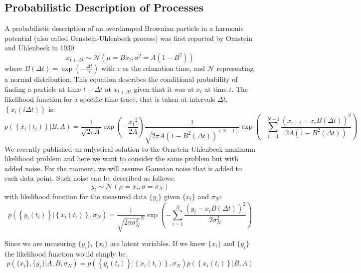 \documentclass[%
 reprint,
 amsmath,amssymb,
 aps,
]{revtex4-1}
\begin{document}
\subsection{Probabilistic Description of Processes}
A probabilistic description of an overdamped Brownian particle in a harmonic potential (also called Ornstein-Uhlenbeck process) was first reported by Ornstein and Uhlenbeck in 1930 \cite{RN28}
\begin{equation}\label{OUp}
	x_{t+\Delta t} \sim \mathcal{N}(\mu=Bx_{t},\sigma^{2}=A(1-B^{2}))
\end{equation}
where $B(\Delta t) = \exp \left( { - \frac{\Delta t}{\tau}} \right)$ with $\tau$ as the relaxation time, and $\mathcal{N}$ representing a normal distribution.
This equation describes the conditional probability of finding a particle at time $t+\Delta t$ at $x_{t+\Delta t}$ given that it was at $x_{t}$ at time $t$.  The likelihood function for a specific time trace, that is taken at intervals $\Delta t$, $\left\{x_i(i\Delta t)\right\}$ is:
\begin{equation}
	p\left( \left\{x_i(t_i)\right\} \left| B, A \right.\right) =
	\frac{1}{\sqrt {2 \pi A} }
	\exp \left( { - \frac{{x_1}^2}{2A}}\right)
	\frac{1}{{\sqrt {2\pi A(1-B^{2}(\Delta t))}^{(N-1)} }}
	\exp \left( { - \sum\limits_{i=1}^{N-1}\frac{{{{\left( {x_{i+1} - {x_i}B(\Delta t)} \right)}^2}}}{{2A(1-B^{2}(\Delta t))}}} \right)
\end{equation}
We recently published an anlystical solution to the Ornstein-Uhlenbeck maximum likelihood problem \cite{RN91} and here we want to consider the same problem but with added noise.  For the moment, we will assume Gaussian noise that is added to each data point.  Such noise can be described as follows:
\begin{equation}
	y_{i} \sim \mathcal{N}(\mu=x_{i},\sigma=\sigma_{N})
\end{equation}
with likelihood function for the measured data $\{y_{i}\}$ given $\{x_{i}\}$ and $\sigma_{N}$:
\begin{equation}
	p\left( \left\{y_i(t_i)\right\} \left| \left\{x_i(t_i)\right\},\sigma_{N} \right.\right) =
	\frac{1}{{\sqrt {2\pi \sigma_{N}^{2}}^{N} }}
	\exp \left( { - \sum\limits_{i=1}^{N}\frac{{{{\left( {y_{i} - x_{i}B(\Delta t)} \right)}^2}}}{{2\sigma_{N}^{2}}}} \right)
\end{equation}

Since we are measuring $\{y_{i}\}$, $\{x_{i}\}$ are latent variables.  If we knew $\{x_{i}\}$ and $\{y_{i}\}$ the likelihood function would simply be.
\begin{equation}
	p\left( \{x_{i}\},\{y_{i}\}|A,B,\sigma_{N}\right) = 
	p\left( \left\{y_i(t_i)\right\} \left| \left\{x_i(t_i)\right\},\sigma_{N} \right.\right)
	p\left( \left\{x_i(t_i)\right\} \left| B, A \right.\right)
\end{equation}
\end{document}
